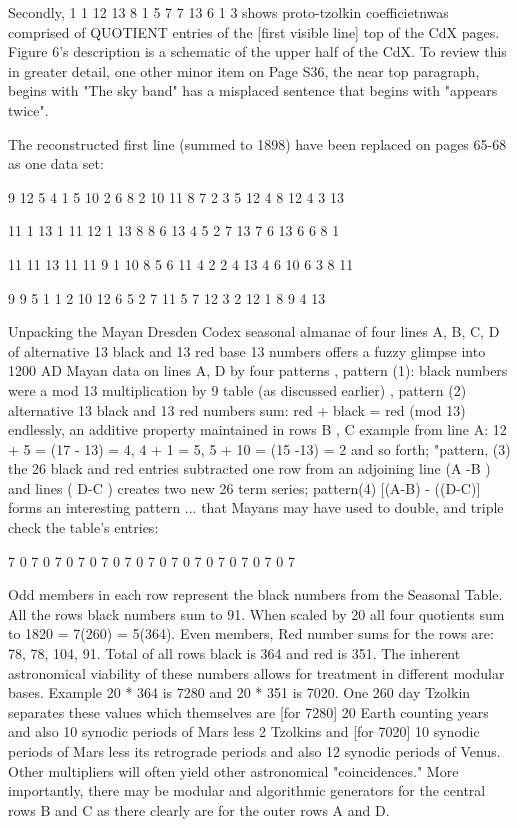 \documentclass[12pt]{article}
\begin{document}
Secondly, 1 1 12 13 8 1 5 7 7 13 6 1 3 shows proto-tzolkin coefficietnwas comprised of QUOTIENT entries of the [first visible line] top of the CdX pages. Figure 6's description is a schematic of the upper half of the CdX. To review this in greater detail,  one other minor item on Page S36, the near top paragraph,  begins with "The sky band" has a misplaced sentence that begins with "appears twice".

The reconstructed first line (summed to 1898) have been replaced on pages 65-68 as one data set:

9 12 5 4 1 5 10 2 6 8 2 10 11 8 7 2 3 5 12 4 8 12 4 3 13 

11 1 13 1 11 12 1 13 8 8 6 13 4 5 2 7 13 7 6 13 6 6 8 1

11 11 13 11 11 9 1 10 8 5 6 11 4 2 2 4 13 4 6 10 6 3 8 11

9 9 5 1 1 2 10 12 6 5 2 7 11 5 7 12 3 2 12 1 8 9 4 13

Unpacking the Mayan Dresden Codex seasonal almanac of four lines A, B, C, D of alternative 13 black and 13 red base 13 numbers offers a fuzzy glimpse into 1200 AD Mayan data on lines A, D by four patterns , pattern (1): black numbers were a mod 13 multiplication by 9 table (as discussed earlier) , pattern (2) alternative 13 black and 13 red numbers sum: red + black = red (mod 13) endlessly, an additive property maintained in rows B , C example from line A: 12 + 5 = (17 - 13) = 4, 4 + 1 = 5, 5 + 10 = (15 -13) = 2 and so forth;  "pattern, (3) the 26 black and red entries subtracted one row from an adjoining line (A -B ) and lines ( D-C ) creates two new 26 term series; pattern(4) [(A-B) - ((D-C)] forms an interesting pattern ... that Mayans may have used to double, and triple check the table's entries:

7 0 7 0 7 0 7 0 7 0 7 0 7 0 7 0 7 0 7 0 7 0 7 0 7

Odd members in each row represent the black numbers from the Seasonal Table. All the rows black numbers sum to 91. When scaled by 20 all four quotients sum to 1820 = 7(260) = 5(364). Even members, Red number sums for the rows are: 78, 78, 104, 91. Total of all rows black is 364 and red is 351. The inherent astronomical viability of these numbers allows for treatment in different modular bases. Example 20 * 364 is 7280 and 20 * 351 is 7020. One 260 day Tzolkin separates these values which themselves are [for 7280] 20 Earth counting years and also 10 synodic periods of Mars less 2 Tzolkins and [for 7020] 10 synodic periods of Mars less its retrograde periods and also 12 synodic periods of Venus. Other multipliers will often yield other astronomical "coincidences." More importantly, there may be modular and algorithmic generators for the central rows B and C as there clearly are for the outer rows A and D.
\end{document}
